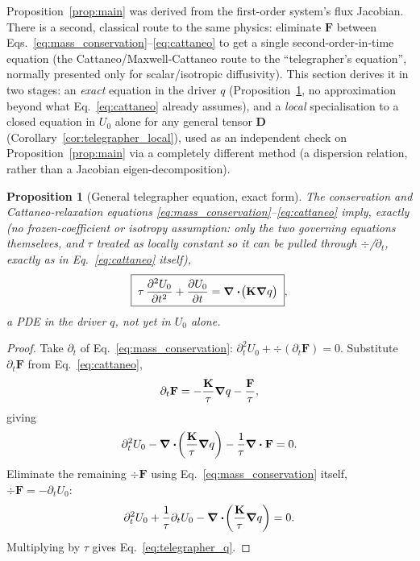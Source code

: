 \documentclass[11pt, a4paper, parskip]{scrartcl}
\theoremstyle{plain}
\newtheorem{proposition}{Proposition}
\theoremstyle{definition}
\theoremstyle{remark}
\newcommand{\driver}{q}                                  %
\newcommand{\Kmat}{\mathbf{K}}                            %
\newcommand{\Fdiff}{\mathbf{F}}                           %
\newcommand{\taurelax}{\tau}                              %
\newcommand{\Deff}{\mathbf{D}}                            %
\begin{document}
Proposition~\ref{prop:main} was derived from the first-order system's
flux Jacobian. There is a second, classical route to the same physics:
eliminate $\Fdiff$ between Eqs.~\eqref{eq:mass_conservation}--\eqref{eq:cattaneo}
to get a single second-order-in-time equation (the Cattaneo/Maxwell-Cattaneo
route to the ``telegrapher's equation'', normally presented only for
scalar/isotropic diffusivity). This section derives it in two stages: an
\emph{exact} equation in the driver $\driver$ (Proposition~\ref{prop:telegrapher},
no approximation beyond what Eq.~\eqref{eq:cattaneo} already assumes), and
a \emph{local} specialisation to a closed equation in $U_0$ alone for any
general tensor $\Deff$ (Corollary~\ref{cor:telegrapher_local}), used as an
independent check on Proposition~\ref{prop:main} via a completely
different method (a dispersion relation, rather than a Jacobian
eigen-decomposition).

\begin{proposition}[General telegrapher equation, exact form]
\label{prop:telegrapher}
The conservation and Cattaneo-relaxation equations
\eqref{eq:mass_conservation}--\eqref{eq:cattaneo} imply, exactly (no
frozen-coefficient or isotropy assumption: only the two governing
equations themselves, and $\taurelax$ treated as locally constant so it
can be pulled through $\div$/$\partial_t$, exactly as in
Eq.~\eqref{eq:cattaneo} itself),
\begin{equation}
  \label{eq:telegrapher_q}
  \boxed{\;\taurelax\,\pdv[2]{U_0}{t} + \pdv{U_0}{t} = \div\!\big(\Kmat\grad \driver\big)\;} ,
\end{equation}
a PDE in the \emph{driver} $\driver$, not yet in $U_0$ alone.
\end{proposition}

\begin{proof}
Take $\partial_t$ of Eq.~\eqref{eq:mass_conservation}:
$\partial_t^2 U_0 + \div(\partial_t\Fdiff)=0$. Substitute
$\partial_t\Fdiff$ from Eq.~\eqref{eq:cattaneo},
\begin{equation}
  \partial_t\Fdiff = -\frac{\Kmat}{\taurelax}\grad \driver - \frac{\Fdiff}{\taurelax} ,
\end{equation}
giving
\begin{equation}
  \partial_t^2U_0 - \div\!\left(\frac{\Kmat}{\taurelax}\grad \driver\right) - \frac{1}{\taurelax}\div\Fdiff = 0 .
\end{equation}
Eliminate the remaining $\div\Fdiff$ using
Eq.~\eqref{eq:mass_conservation} itself, $\div\Fdiff=-\partial_tU_0$:
\begin{equation}
  \partial_t^2U_0 + \frac{1}{\taurelax}\partial_tU_0 - \div\!\left(\frac{\Kmat}{\taurelax}\grad \driver\right) = 0 .
\end{equation}
Multiplying by $\taurelax$ gives Eq.~\eqref{eq:telegrapher_q}.
\end{proof}
\end{document}
